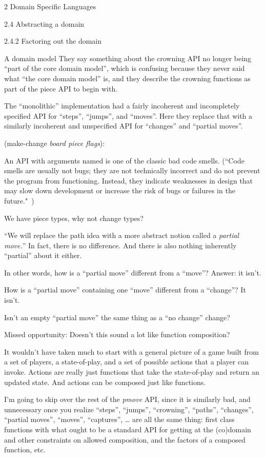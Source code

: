 \documentclass[12pt]{PalisadesLakesBook}
\begin{document}
\begin{plSection}{2 Domain Specific Languages}
\begin{plSection}{2.4 Abstracting a domain}
\begin{plSection}{2.4.2 Factoring out the domain}
\begin{plSection}{A domain model}
They say something about the crowning API no longer
being ``part of the core domain model'', which is confusing
because they never said what ``the core domain model'' is,
and they describe the crowning functions as part of the piece API
to begin with.

The ``monolithic'' implementation had a fairly incoherent
and incompletely specified
API for ``steps'', ``jumps'', and ``moves''.
Here they replace that with a similarly incoherent
and unspecified API for ``changes'' and ``partial moves''.

{\schemeFont (make-change {\itshape board piece flags})}:

An API with arguments named {}
is one of the classic bad code smells.
(``Code smells are usually not bugs; 
they are not technically incorrect and 
do not prevent the program from functioning. 
Instead, they indicate weaknesses in design 
that may slow down development 
or increase the risk of bugs or failures 
in the future."~\cite{wiki:CodeSmell})

We have piece types, why not change types?

``We will replace the path idea with a more abstract notion 
called a \emph{partial move.}''
In fact, there is no difference.
And there is also nothing inherently ``partial'' about it either.

In other words, how is a ``partial move'' different from a 
``move''?
Answer: it isn't. 

How is a ``partial move'' containing one ``move'' different from a 
``change''? It isn't.

Isn't an empty ``partial move'' the same thing as a
``no change'' change? 

Missed opportunity: Doesn't this sound a lot like function
composition?

It wouldn't have taken much to start with a general picture
of a game built from a set of players, a state-of-play,
and a set of possible actions that a player can invoke. 
Actions are really just functions that take the state-of-play
and return an updated state. 
And actions can be composed just like functions.

I'm going to skip over the rest of the 
{\schemeFont \itshape pmove} API, 
since it is similarly bad,
and unnecessary once you realize ``steps'',
``jumps'', ``crowning'', ``paths'', ``changes'',
``partial moves'', ``moves'', ``captures'', {\ldots}
 are all the same thing:
first class functions with what ought to be a standard API
for getting at the (co)domain and other constraints on allowed
composition, and
the factors of a composed function,
etc.


\end{plSection}
\end{plSection}
\end{plSection}
\end{plSection}
\end{document}
